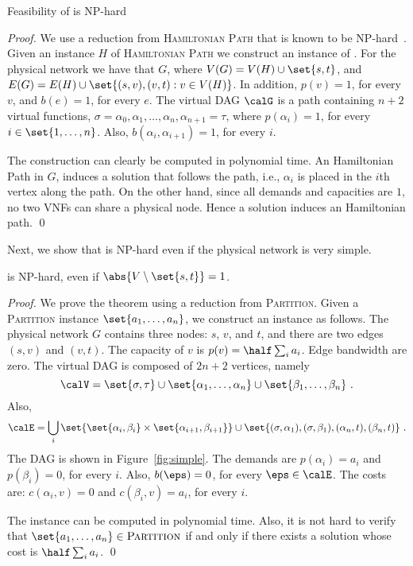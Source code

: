 \begin{theorem}
Feasibility of \scp is NP-hard
\end{theorem}
\begin{proof}
We use a reduction from \textsc{Hamiltonian Path} that is known to be
NP-hard~\cite{GarJoh79}.
%
Given an instance $H$ of \textsc{Hamiltonian Path} we construct an
instance of \scp.  For the physical network we have that $G$, where
$V(G) = V(H) \cup \set{s,t}$, and $E(G) = E(H) \cup \set{(s,v),(v,t) :
  v \in V(H)}$.  In addition, $p(v) = 1$, for every $v$, and $b(e) =
1$, for every $e$.  The virtual DAG $\calG$ is a path containing $n+2$
virtual functions, $\sigma = \alpha_0, \alpha_1, \ldots, \alpha_n,
\alpha_{n+1} = \tau$, where $p(\alpha_i) = 1$, for every $i \in
\set{1,\ldots,n}$.  Also, $b(\alpha_i,\alpha_{i+1}) = 1$, for every
$i$.

The construction can clearly be computed in polynomial time.
%
An Hamiltonian Path in $G$, induces a \scp solution that follows the
path, i.e., $\alpha_i$ is placed in the $i$th vertex along the path.
%
On the other hand, since all demands and capacities are $1$, no two
VNFs can share a physical node.  Hence a \scp solution induces an
Hamiltonian path.
%
\qed
\end{proof}

Next, we show that \scp is NP-hard even if the physical network is
very simple. 

\begin{theorem}
\label{thm:simple}
\scp is NP-hard, even if $\abs{V \setminus \set{s,t}} = 1$.
\end{theorem}
\begin{proof}
We prove the theorem using a reduction from \textsc{Partition}.
Given a \textsc{Partition} instance $\set{a_1, \ldots, a_n}$, we
construct an \scp instance as follows.
%
The physical network $G$ contains three nodes: $s$, $v$, and $t$, and
there are two edges $(s,v)$ and $(v,t)$.  The capacity of $v$ is $p(v)
= \half \sum_i a_i$.  Edge bandwidth are zero.
%
The virtual DAG is composed of $2n+2$ vertices, namely
\[
\calV
= \set{\sigma,\tau}
  \cup \set{\alpha_1, \ldots, \alpha_n}
  \cup \set{\beta_1, \ldots, \beta_n}
~.
\]
Also,
\[
\calE
= \bigcup_i \set{ \set{\alpha_i,\beta_i} \times \set{\alpha_{i+1},\beta_{i+1}} } 
  \cup
  \set{ (\sigma,\alpha_1), (\sigma,\beta_1), (\alpha_n,t), (\beta_n,t) }
~.
\]
The DAG is shown in Figure~\ref{fig:simple}.
%
The demands are $p(\alpha_i) = a_i$ and $p(\beta_i) = 0$, for every
$i$.  Also, $b(\eps) = 0$, for every $\eps \in \calE$.  The costs are:
$c(\alpha_i,v) = 0$ and $c(\beta_i,v) = a_i$, for every $i$.

The \scp instance can be computed in polynomial time.
%
Also, it is not hard to verify that $\set{a_1, \ldots, a_n} \in
\textsc{Partition}$ if and only if there exists a solution whose cost
is $\half \sum_i a_i$.
%
\qed
\end{proof}

